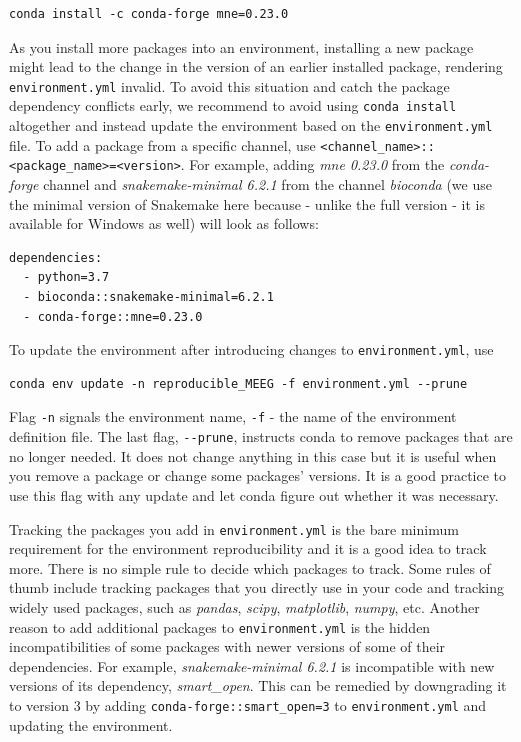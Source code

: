 \documentclass[a4paper,man,floatsintext,natbib]{apa6}
\begin{document}
\begin{verbatim}
conda install -c conda-forge mne=0.23.0
\end{verbatim}

As you install more packages into an environment, installing a new package might lead to the change in the version of an earlier installed package, rendering \verb|environment.yml| invalid. To avoid this situation and catch the package dependency conflicts early, we recommend to avoid using \verb|conda install| altogether and instead update the environment based on the \verb|environment.yml| file. To add a package from a specific channel, use \verb|<channel_name>::<package_name>=<version>|. For example, adding \emph{mne 0.23.0} from the \emph{conda-forge} channel and \emph{snakemake-minimal 6.2.1} from the channel \emph{bioconda} (we use the minimal version of Snakemake here because - unlike the full version - it is available for Windows as well) will look as follows:

\begin{verbatim}
dependencies:
  - python=3.7
  - bioconda::snakemake-minimal=6.2.1
  - conda-forge::mne=0.23.0
\end{verbatim}

To update the environment after introducing changes to \verb|environment.yml|, use

\begin{verbatim}
conda env update -n reproducible_MEEG -f environment.yml --prune
\end{verbatim}

Flag \verb|-n| signals the environment name, \verb|-f| - the name of the environment definition file. The last flag, \verb|--prune|, instructs conda to remove packages that are no longer needed. It does not change anything in this case but it is useful when you remove a package or change some packages' versions. It is a good practice to use this flag with any update and let conda figure out whether it was necessary.

Tracking the packages you add in \verb|environment.yml| is the bare minimum requirement for the environment reproducibility and it is a good idea to track more. There is no simple rule to decide which packages to track. Some rules of thumb include tracking packages that you directly use in your code and tracking widely used packages, such as \emph{pandas}, \emph{scipy}, \emph{matplotlib}, \emph{numpy}, etc. Another reason to add additional packages to \verb|environment.yml| is the hidden incompatibilities of some packages with newer versions of some of their dependencies. For example, \emph{snakemake-minimal 6.2.1} is incompatible with new versions of its dependency, \emph{smart\_open}. This can be remedied by downgrading it to version 3 by adding \verb|conda-forge::smart_open=3| to \verb|environment.yml| and updating the environment.
\end{document}
